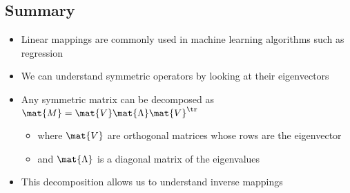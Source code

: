 
\begin{slide}
\section{Summary}

\begin{PauseHighLight}
  \begin{itemize}
  \item Linear mappings are commonly used in machine learning algorithms
    such as regression\pause
  \item We can understand symmetric operators by looking at their eigenvectors\pause
  \item Any symmetric matrix can be decomposed as $\mat{M} = \mat{V}
    \mat{\Lambda} \mat{V}^\tr$
    \begin{itemize}
    \item where $\mat{V}$ are orthogonal matrices whose rows are the eigenvector
    \item and $\mat{\Lambda}$ is a diagonal matrix of the eigenvalues\pause
    \end{itemize}
  \item This decomposition allows us to understand inverse mappings\pause
  \end{itemize}
\end{PauseHighLight}

\end{slide}


